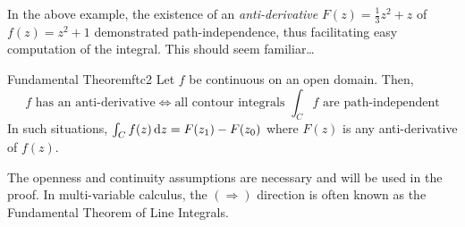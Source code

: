 \goodbreak


In the above example, the existence of an \emph{anti-derivative} $F(z)=\frac 13z^2+z$ of $f(z)=z^2+1$ demonstrated path-independence, thus facilitating easy computation of the integral. This should seem familiar\ldots 

\begin{thm}{Fundamental Theorem}{ftc2}
	Let $f$ be continuous on an open domain. Then,
	\[
		\text{$f$ has an anti-derivative} \iff \text{all contour integrals $\textstyle\int_Cf$ are path-independent}
	\]
	In such situations, $\int_Cf(z)\,{\mathrm{d} z}=F(z_1)-F(z_0)$ where $F(z)$ is any anti-derivative of $f(z)$.
\end{thm}

The openness and continuity assumptions are necessary and will be used in the proof. In multi-variable calculus, the $(\Rightarrow)$ direction is often known as the Fundamental Theorem of Line Integrals.

